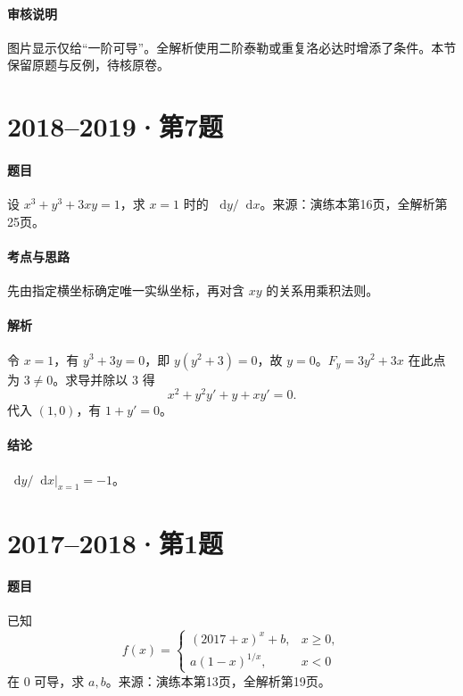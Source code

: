 \documentclass[UTF8,fontset=fandol,12pt,oneside,openany]{ctexrep}
\newcommand{\dd}{\mathop{}\!\mathrm d}
\theoremstyle{definition}
\begin{document}
\paragraph{审核说明}图片显示仅给“一阶可导”。全解析使用二阶泰勒或重复洛必达时增添了条件。本节保留原题与反例，待核原卷。

\par\addvspace{18pt}\noindent\begin{minipage}{\linewidth}
\section{2018--2019·第7题}
\paragraph{题目}设 $x^3+y^3+3xy=1$，求 $x=1$ 时的 $\dd y/\dd x$。来源：演练本第16页，全解析第25页。
\end{minipage}\par
\paragraph{考点与思路}先由指定横坐标确定唯一实纵坐标，再对含 $xy$ 的关系用乘积法则。
\paragraph{解析}令 $x=1$，有 $y^3+3y=0$，即 $y(y^2+3)=0$，故 $y=0$。$F_y=3y^2+3x$ 在此点为 $3\ne0$。求导并除以 $3$ 得
\[
 x^2+y^2y'+y+xy'=0.
\]
代入 $(1,0)$，有 $1+y'=0$。
\paragraph{结论}$\left.\dd y/\dd x\right|_{x=1}=-1$。

\par\addvspace{18pt}\noindent\begin{minipage}{\linewidth}
\section{2017--2018·第1题}
\paragraph{题目}已知
\[
 f(x)=\begin{cases}(2017+x)^x+b,&x\ge0,\\a(1-x)^{1/x},&x<0\end{cases}
\]
在 $0$ 可导，求 $a,b$。来源：演练本第13页，全解析第19页。
\end{minipage}\par
\end{document}
